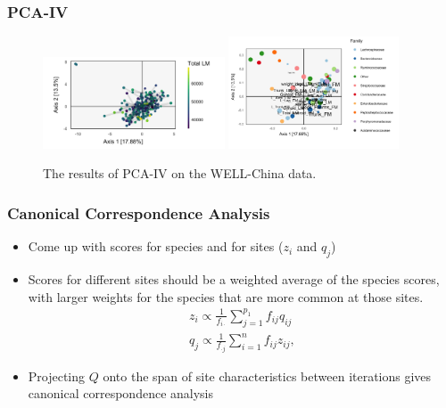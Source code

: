 \documentclass{beamer}
\begin{document}
\begin{frame}
  \frametitle{PCA-IV}
    \begin{figure}[ht]
      \centering
      \includegraphics[width=0.48\textwidth]{figure/pcaiv_scores_total_lm}
      \includegraphics[width=0.45\textwidth]{figure/pcaiv_loadings}
      \caption{The results of PCA-IV on the WELL-China
        data. \label{fig:pcaiv_scores_loadings} }
    \end{figure}
\end{frame}

\begin{frame}
  \frametitle{Canonical Correspondence Analysis}
  \begin{itemize}
  \item Come up with scores for species and for sites ($z_{i}$ and $q_{j}$)
  \item Scores for different sites should be a weighted average of the species
    scores, with larger weights for the species that are more common at those
    sites.
    \begin{align*}
      z_{i} \propto \frac{1}{f_{i\cdot}}\sum_{j = 1}^{p_{1}}f_{ij}q_{ij} \\
      q_{j} \propto \frac{1}{f_{\cdot j}} \sum_{i = 1}^{n} f_{ij}z_{ij},
    \end{align*}
  \item Projecting $Q$ onto the span of site characteristics between iterations
    gives canonical correspondence analysis
  \end{itemize}  
\end{frame}
\end{document}
